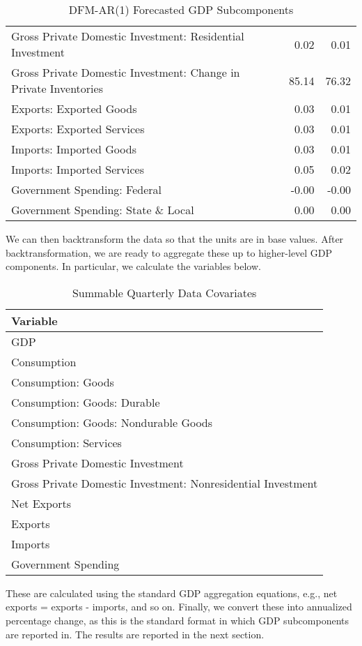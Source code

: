 \documentclass[11pt, letterpaper]{article}\usepackage[]{graphicx}\usepackage[]{color}
\begin{document}
\begin{table}[H]
\begin{tabular}{lrr}
  Gross Private Domestic Investment: Residential Investment & 0.02 & 0.01 \\ 
  Gross Private Domestic Investment: Change in Private Inventories & 85.14 & 76.32 \\ 
  Exports: Exported Goods & 0.03 & 0.01 \\ 
  Exports: Exported Services & 0.03 & 0.01 \\ 
  Imports: Imported Goods & 0.03 & 0.01 \\ 
  Imports: Imported Services & 0.05 & 0.02 \\ 
  Government Spending: Federal & -0.00 & -0.00 \\ 
  Government Spending: State \& Local & 0.00 & 0.00 \\ 
   \hline
\end{tabular}
\endgroup
\caption{DFM-AR(1) Forecasted GDP Subcomponents} 
\end{table}


We can then backtransform the data so that the units are in base values. After backtransformation, we are ready to aggregate these up to higher-level GDP components. In particular, we calculate the variables below.
\begin{table}[H]
\centering
\begingroup\scriptsize
\begin{tabular}{l}
  \hline
Variable \\ 
  \hline
GDP \\ 
  Consumption \\ 
  Consumption: Goods \\ 
  Consumption: Goods: Durable \\ 
  Consumption: Goods: Nondurable Goods \\ 
  Consumption: Services \\ 
  Gross Private Domestic Investment \\ 
  Gross Private Domestic Investment: Nonresidential Investment \\ 
  Net Exports \\ 
  Exports \\ 
  Imports \\ 
  Government Spending \\ 
   \hline
\end{tabular}
\endgroup
\caption{Summable Quarterly Data Covariates} 
\end{table}

These are calculated using the standard GDP aggregation equations, e.g., net exports = exports - imports, and so on.
Finally, we convert these into annualized percentage change, as this is the standard format in which GDP subcomponents are reported in. The results are reported in the next section.
\end{document}
